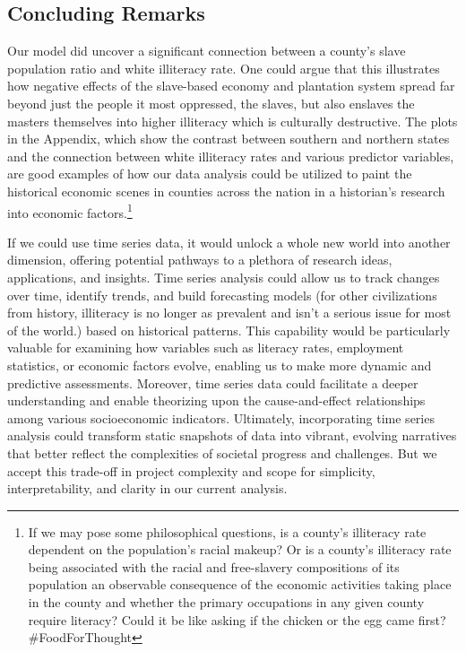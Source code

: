 \documentclass[a4paper,12pt]{article}
\begin{document}
\subsection{Concluding Remarks}
Our model did uncover a significant connection between a county's slave population ratio and white illiteracy rate. One could argue that this illustrates how negative effects of the slave-based economy and plantation system spread far beyond just the people it most oppressed, the slaves, but also enslaves the masters themselves into higher illiteracy which is culturally destructive. The plots in the Appendix, which show the contrast between southern and northern states and the connection between white illiteracy rates and various predictor variables, are good examples of how our data analysis could be utilized to paint the historical economic scenes in counties across the nation in a historian's research into economic factors.\footnote{\*If we may pose some philosophical questions, is a county's illiteracy rate dependent on the population's racial makeup? Or is a county's illiteracy rate being associated with the racial and free-slavery compositions of its population an observable consequence of the economic activities taking place in the county and whether the primary occupations in any given county require literacy? Could it be like asking if the chicken or the egg came first? \#FoodForThought}

If we could use time series data, it would unlock a whole new world into another dimension, offering potential pathways to a plethora of research ideas, applications, and insights. Time series analysis could allow us to track changes over time, identify trends, and build forecasting models (for other civilizations from history, illiteracy is no longer as prevalent and isn't a serious issue for most of the world.) based on historical patterns. This capability would be particularly valuable for examining how variables such as literacy rates, employment statistics, or economic factors evolve, enabling us to make more dynamic and predictive assessments. Moreover, time series data could facilitate a deeper understanding and enable theorizing upon the cause-and-effect relationships among various socioeconomic indicators. Ultimately, incorporating time series analysis could transform static snapshots of data into vibrant, evolving narratives that better reflect the complexities of societal progress and challenges. But we accept this trade-off in project complexity and scope for simplicity, interpretability, and clarity in our current analysis.
\end{document}
